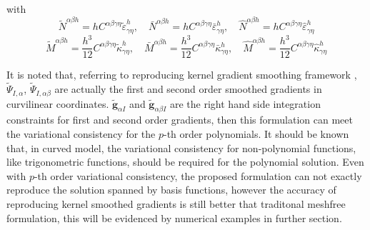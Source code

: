 with
\begin{equation}
\tilde N^{\alpha\beta h} = hC^{\alpha\beta\gamma\eta}\tilde \varepsilon^h_{\gamma\eta} ,\quad
\bar N^{\alpha\beta h} = hC^{\alpha\beta\gamma\eta}\bar \varepsilon^h_{\gamma\eta} ,\quad
\hat N^{\alpha\beta h} = hC^{\alpha\beta\gamma\eta}\hat \varepsilon^h_{\gamma\eta}
\end{equation}
\begin{equation}
\tilde M^{\alpha\beta h} = \frac{h^3}{12}C^{\alpha\beta\gamma\eta}\tilde \kappa^h_{\gamma\eta} ,\quad
\bar M^{\alpha\beta h} = \frac{h^3}{12}C^{\alpha\beta\gamma\eta}\bar \kappa^h_{\gamma\eta} ,\quad
\hat M^{\alpha\beta h} = \frac{h^3}{12}C^{\alpha\beta\gamma\eta}\hat \kappa^h_{\gamma\eta}
\end{equation}

It is noted that, referring to reproducing kernel gradient smoothing framework \cite{wang2019d}, $\tilde \Psi_{I,\alpha}$, $\tilde \Psi_{I,\alpha\beta}$ are actually the first and second order smoothed gradients in curvilinear coordinates. $\tilde{\boldsymbol g}_{\alpha I}$ and $\tilde{\boldsymbol g}_{\alpha \beta I}$ are the right hand side integration constraints for first and second order gradients, then this formulation can meet the variational consistency for the $p$-th order polynomials. It should be known that, in curved model, the variational consistency for non-polynomial functions, like trigonometric functions, should be required for the polynomial solution. Even with $p$-th order variational consistency, the proposed formulation can not exactly reproduce the solution spanned by basis functions, however the accuracy of reproducing kernel smoothed gradients is still better that traditonal meshfree formulation, this will be evidenced by numerical examples in further section.
